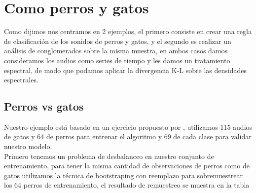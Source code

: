 \documentclass[twocolumn,10pt]{asme2ej}
\begin{document}

\section*{Como perros y gatos} %
\label{sec:como_perros_y_gatos}
Como dijimos nos centramos en 2 ejemplos, el primero consiste en crear una regla de clasificaci\'on de los sonidos de perros y gatos, y el segundo es realizar un an\'alisis de conglomerados sobre la misma muestra, en ambos casos damos consideramos los audios como series de tiempo y les damos un tratamiento espectral, de modo que podamos aplicar la divergencia K-L sobre las densidades espectrales.
\subsection*{Perros vs gatos} %
\label{sub:perros_vs_gatos}
Nuestro ejemplo est\'a basado en un ejercicio propuesto por \cite{DATOS2}, utilizamos 115 audios de gatos y 64 de perros para entrenar el algoritmo y 69 de cada clase para validar nuestro modelo.\\

Primero tenemos un problema de desbalanceo en nuestro conjunto de entrenamiento, para tener la misma cantidad de observaciones de perros como de gatos utilizamos la t\'ecnica de bootstraping con reemplazo para sobremuestrear los 64 perros de entrenamiento, el resultado de remuestreo se muestra en la tabla 
\end{document}
